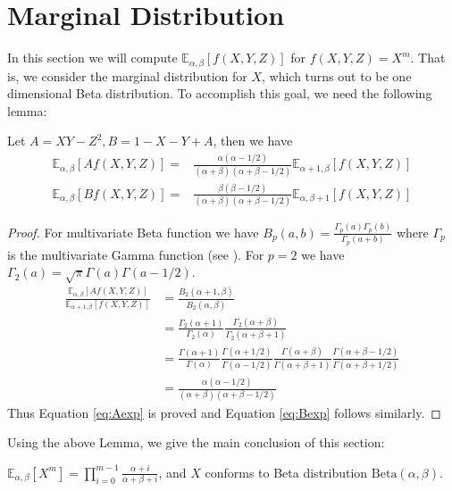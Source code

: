 \documentclass[mathpazo]{cmr}
\def\E{\mathbb{E}}
\def\Beta{\textrm{Beta}}
\begin{document}
\section{Marginal Distribution}
In this section we will compute $\E_{\alpha,\beta}[f(X,Y, Z)]$
for $f(X,Y,Z)=X^m$. That is, we consider the marginal distribution for $X$,
which turns out to be one dimensional Beta distribution.
To accomplish this goal, we need the following lemma:
\begin{lemma}\label{lem:AB}
	Let $A = XY - Z^2, B = 1 - X - Y + A$, then we have
	\begin{align}
	\E_{\alpha, \beta}[Af(X,Y,Z)] =&
	\frac{\alpha(\alpha-1/2)}{(\alpha+\beta)(\alpha+\beta-1/2)}\E_{\alpha+1, \beta}[f(X,Y,Z)]
	\label{eq:Aexp} \\
	\E_{\alpha,\beta}[Bf(X,Y,Z)] =&
	\frac{\beta(\beta-1/2)}{(\alpha+\beta)(\alpha+\beta-1/2)}\E_{\alpha, \beta+1}[f(X,Y,Z)]
	\label{eq:Bexp}
	\end{align}
\end{lemma}
\begin{proof}
	For multivariate Beta function we have
	$B_p(a, b) = \frac{\Gamma_p(a)\Gamma_p(b)}{\Gamma_p(a+b)}$
	where $\Gamma_p$ is the multivariate Gamma function (see \cite{ingham_1933}).
	For $p=2$ we have $\Gamma_2(a) = \sqrt{\pi}\Gamma(a)\Gamma(a-1/2)$.
	\begin{align*}
	\frac{\E_{\alpha, \beta}[Af(X,Y,Z)]}{\E_{\alpha+1, \beta}[f(X,Y,Z)]} &
	=\frac{B_2(\alpha+1,\beta)}{B_2(\alpha,\beta)}\\
	&=\frac{\Gamma_2(\alpha+1)}{\Gamma_2(\alpha)}
	\frac{\Gamma_2(\alpha+\beta)}{\Gamma_2(\alpha+\beta+1)}\\
	& =\frac{\Gamma(\alpha+1)}{\Gamma(\alpha)}
	\frac{\Gamma(\alpha+1/2)}{\Gamma(\alpha-1/2)}
	\frac{\Gamma(\alpha+\beta)}{\Gamma(\alpha+\beta+1)}
	\frac{\Gamma(\alpha+\beta-1/2)}{\Gamma(\alpha+\beta+1/2)}\\
	&=\frac{\alpha(\alpha-1/2)}{(\alpha+\beta)(\alpha+\beta-1/2)}
	\end{align*}
	Thus Equation \eqref{eq:Aexp} is proved and Equation \eqref{eq:Bexp} follows similarly.
\end{proof}
Using the above Lemma, we give the main conclusion of this section:
\begin{theorem}\label{thm:Xm}
	$\E_{\alpha, \beta}[X^m] =
	\prod_{i=0}^{m-1}\frac{\alpha+i}{\alpha+\beta+i}$, and $X$
	conforms to Beta distribution $\Beta(\alpha, \beta)$.
\end{theorem}
\end{document}
